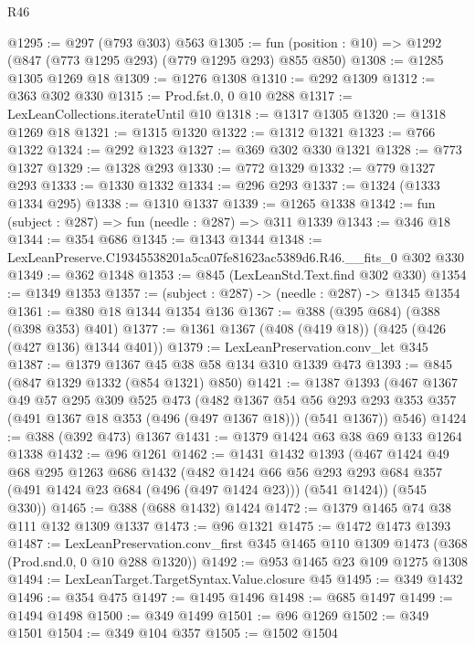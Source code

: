 \begin{lexlean}{R46}
\begin{coremodule}
@1295 := @297 (@793 @303) @563
@1305 := fun (position : @10) => @1292 (@847 (@773 @1295 @293) (@779 @1295 @293) @855 @850)
@1308 := @1285 @1305 @1269 @18
@1309 := @1276 @1308
@1310 := @292 @1309
@1312 := @363 @302 @330
@1315 := Prod.fst.{0, 0} @10 @288
@1317 := LexLeanCollections.iterateUntil @10
@1318 := @1317 @1305
@1320 := @1318 @1269 @18
@1321 := @1315 @1320
@1322 := @1312 @1321
@1323 := @766 @1322
@1324 := @292 @1323
@1327 := @369 @302 @330 @1321
@1328 := @773 @1327
@1329 := @1328 @293
@1330 := @772 @1329
@1332 := @779 @1327 @293
@1333 := @1330 @1332
@1334 := @296 @293
@1337 := @1324 (@1333 @1334 @295)
@1338 := @1310 @1337
@1339 := @1265 @1338
@1342 := fun (subject : @287) => fun (needle : @287) => @311 @1339
@1343 := @346 @18
@1344 := @354 @686
@1345 := @1343 @1344
@1348 := LexLeanPreserve.C19345538201a5ca07fe81623ac5389d6.R46.__fits_0 @302 @330
@1349 := @362 @1348
@1353 := @845 (LexLeanStd.Text.find @302 @330)
@1354 := @1349 @1353
@1357 := (subject : @287) -> (needle : @287) -> @1345 @1354
@1361 := @380 @18 @1344 @1354 @136
@1367 := @388 (@395 @684) (@388 (@398 @353) @401)
@1377 := @1361 @1367 (@408 (@419 @18)) (@425 (@426 (@427 @136) @1344 @401))
@1379 := LexLeanPreservation.conv_let @345
@1387 := @1379 @1367 @45 @38 @58 @134 @310 @1339 @473
@1393 := @845 (@847 @1329 @1332 (@854 @1321) @850)
@1421 := @1387
    @1393
    (@467
      @1367
      @49
      @57
      @295
      @309
      @525
      @473
      (@482
        @1367
        @54
        @56
        @293
        @293
        @353
        @357
        (@491 @1367 @18 @353 (@496 (@497 @1367 @18)))
        (@541 @1367))
      @546)
@1424 := @388 (@392 @473) @1367
@1431 := @1379 @1424 @63 @38 @69 @133 @1264 @1338
@1432 := @96 @1261
@1462 := @1431
    @1432
    @1393
    (@467
      @1424
      @49
      @68
      @295
      @1263
      @686
      @1432
      (@482
        @1424
        @66
        @56
        @293
        @293
        @684
        @357
        (@491 @1424 @23 @684 (@496 (@497 @1424 @23)))
        (@541 @1424))
      (@545 @330))
@1465 := @388 (@688 @1432) @1424
@1472 := @1379 @1465 @74 @38 @111 @132 @1309 @1337
@1473 := @96 @1321
@1475 := @1472 @1473 @1393
@1487 := LexLeanPreservation.conv_first
    @345
    @1465
    @110
    @1309
    @1473
    (@368 (Prod.snd.{0, 0} @10 @288 @1320))
@1492 := @953 @1465 @23 @109 @1275 @1308
@1494 := LexLeanTarget.TargetSyntax.Value.closure @45
@1495 := @349 @1432
@1496 := @354 @475
@1497 := @1495 @1496
@1498 := @685 @1497
@1499 := @1494 @1498
@1500 := @349 @1499
@1501 := @96 @1269
@1502 := @349 @1501
@1504 := @349 @104 @357
@1505 := @1502 @1504

\end{coremodule}
\end{lexlean}
